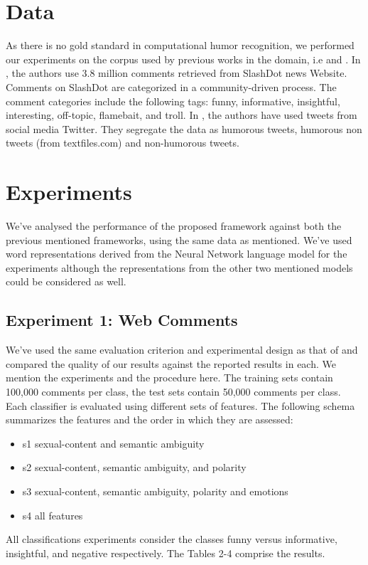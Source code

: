 \documentclass{acm_proc_article-sp}
\begin{document}
\section{Data}

As there is no gold standard in computational humor recognition, we performed our experiments on the corpus used by previous works in the domain, i.e \cite{reyes2010evaluating} and \cite{zhang2014recognizing}.  In \cite{reyes2010evaluating}, the authors use 3.8 million comments retrieved from SlashDot news Website.  Comments on SlashDot are categorized in a community-driven process. The comment categories include the following tags: funny, informative, insightful, interesting, off-topic, flamebait, and troll. In \cite{zhang2014recognizing}, the authors have used tweets from social media Twitter. They segregate the data as humorous tweets, humorous non tweets (from textfiles.com) and non-humorous tweets. 


\section{Experiments}

We've analysed the performance of the proposed framework against both the previous mentioned frameworks, using the same data as mentioned. We've used word representations derived from the Neural Network language model for the experiments although the representations from the other two mentioned models could be considered as well.

\subsection{Experiment 1: Web Comments}

We've used the same evaluation criterion and experimental design as that of \cite{reyes2010evaluating} and compared the quality of our results against the reported results in each. We mention the experiments and the procedure here. The training sets contain 100,000 comments per class, the test sets contain 50,000 comments per class. Each classifier is evaluated using different sets of features.
The following schema summarizes the features and the order in which they are assessed: 
\begin{itemize}  
\item s1 sexual-content and semantic ambiguity
\item s2 sexual-content, semantic ambiguity, and polarity
\item s3 sexual-content, semantic ambiguity, polarity and emotions
\item s4 all features
\end{itemize}
All classifications experiments consider the classes funny
versus informative, insightful, and negative respectively.
The Tables 2-4 comprise the results.
\end{document}
